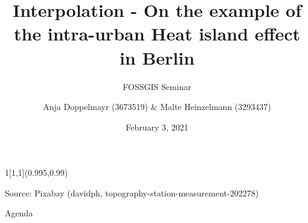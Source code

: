 \documentclass[aspectratio=169]{beamer}
\title{Interpolation - On the example of the intra-urban Heat island effect in Berlin}
\subtitle{FOSSGIS Seminar}
\date{February 3, 2021}
\author{Anja Doppelmayr (3673519) \& Malte Heinzelmann (3293437)}
\institute{Ruprecht-Karls-Universit\"at Heidelberg}
\newlength\beamerleftmargin
\newenvironment*{env}{}{}
\begin{document}
	\begin{frame}[plain]
		\begin{textblock}{1}[1,1](0.995,0.99)
			\setlength\topsep{0pt}
			\begin{flushright}
				\tiny\color{text} Source: Pixabay (davidph, topography-station-measurement-202278)%
			\end{flushright}
		\end{textblock}
		\titlepage
	\end{frame}

	\begin{frame}{Agenda}
		\tableofcontents[]
	\end{frame}

	

	
	
	
	
	
	
	
	

	
	
\end{document}
